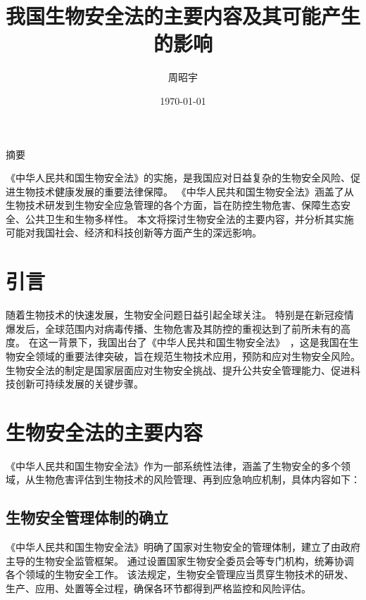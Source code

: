 \documentclass{article}
\title{我国生物安全法的主要内容及其可能产生的影响}
\author{周昭宇}
\date{\today}
\begin{document}
\begin{titlepage}
    \maketitle
\end{titlepage}

\setlength{\parindent}{2em}

\begin{center}
    {\Huge{摘要}}\vspace{2cm}\par
\end{center}
\indent《中华人民共和国生物安全法》的实施，是我国应对日益复杂的生物安全风险、促进生物技术健康发展的重要法律保障。
《中华人民共和国生物安全法》涵盖了从生物技术研发到生物安全应急管理的各个方面，旨在防控生物危害、保障生态安全、公共卫生和生物多样性。
本文将探讨生物安全法的主要内容，并分析其实施可能对我国社会、经济和科技创新等方面产生的深远影响。
\newpage

\tableofcontents
\newpage

\section{引言}\par
随着生物技术的快速发展，生物安全问题日益引起全球关注。
特别是在新冠疫情爆发后，全球范围内对病毒传播、生物危害及其防控的重视达到了前所未有的高度。
在这一背景下，我国出台了《中华人民共和国生物安全法》~\cite{biosecuritylaw2021}，这是我国在生物安全领域的重要法律突破，旨在规范生物技术应用，预防和应对生物安全风险。
生物安全法的制定是国家层面应对生物安全挑战、提升公共安全管理能力、促进科技创新可持续发展的关键步骤。

\section{生物安全法的主要内容}
《中华人民共和国生物安全法》作为一部系统性法律，涵盖了生物安全的多个领域，从生物危害评估到生物技术的风险管理、再到应急响应机制，具体内容如下：
\subsection{生物安全管理体制的确立}
《中华人民共和国生物安全法》明确了国家对生物安全的管理体制，建立了由政府主导的生物安全监管框架。
通过设置国家生物安全委员会等专门机构，统筹协调各个领域的生物安全工作。
该法规定，生物安全管理应当贯穿生物技术的研发、生产、应用、处置等全过程，确保各环节都得到严格监控和风险评估。
\end{document}
